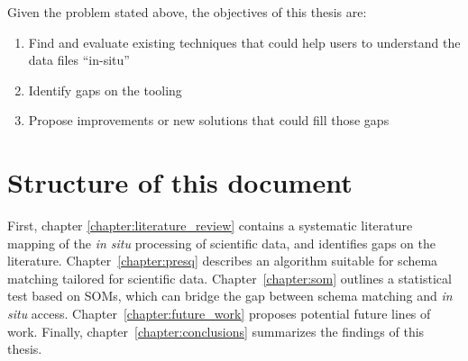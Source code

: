 Given the problem stated above, the objectives of this thesis are:

\begin{enumerate}
    \item Find and evaluate existing techniques that could help users to understand the data files
        ``in-situ''
    \item Identify gaps on the tooling
    \item Propose improvements or new solutions that could fill those gaps
    \label{enum:objectives}
\end{enumerate}

\section{Structure of this document}

First, chapter \ref{chapter:literature_review} contains a systematic literature mapping of the
\emph{in situ} processing of scientific data, and identifies gaps on the literature.
Chapter~\ref{chapter:presq} describes an algorithm
suitable for schema matching tailored for scientific data. Chapter~\ref{chapter:som}
outlines a statistical test based on \glspl{SOM}, which can bridge the gap
between schema matching and \emph{in situ} access. Chapter~\ref{chapter:future_work}
proposes potential future lines of work. Finally, chapter~\ref{chapter:conclusions}
summarizes the findings of this thesis.